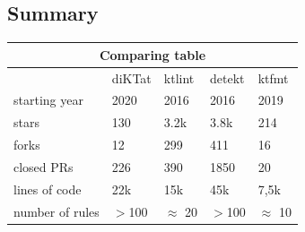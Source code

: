 \subsection{Summary}

\begin{center}
\begin{tabular}{ |p{3cm}|p{2.5cm}|p{2.5cm}|p{2.5cm}|p{2.5cm}|  }
\hline
\multicolumn{5}{|c|}{\textbf{Comparing table}} \\
\hline
& diKTat& ktlint &detekt & ktfmt \\
\hline
starting year & 2020 & 2016 & 2016 & 2019 \\
stars & 130 & 3.2k & 3.8k & 214\\ 
forks & 12 & 299 & 411 & 16\\
closed PRs & 226 & 390 & 1850 & 20 \\
lines of code & 22k & 15k & 45k & 7,5k\\
number of rules & $>$100 & $\approx$ 20 & $>$100 & $\approx$ 10 \\
\hline

\hline
\end{tabular}
\end{center}